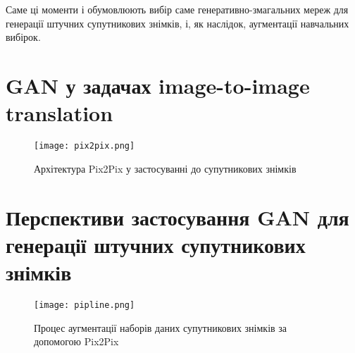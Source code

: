 Саме ці моменти і обумовлюють вибір саме генеративно-змагальних
мереж для генерації штучних супутникових знімків, і, як наслідок,
аугментації навчальних вибірок.

\section{GAN у задачах image-to-image translation}

\begin{figure}[ht]
    \centering
    \texttt{[image: pix2pix.png]}
    \caption{Архітектура Pix2Pix у застосуванні до супутникових знімків}
    \label{fig:pix2pix}
\end{figure}

\section{Перспективи застосування GAN для генерації штучних супутникових знімків}

\begin{figure}[ht]
    \centering
    \texttt{[image: pipline.png]}
    \caption{Процес аугментації наборів даних супутникових знімків за допомогою Pix2Pix}
    \label{fig:pipline}
\end{figure}

\chapconclude{\ref{chap:gans}}